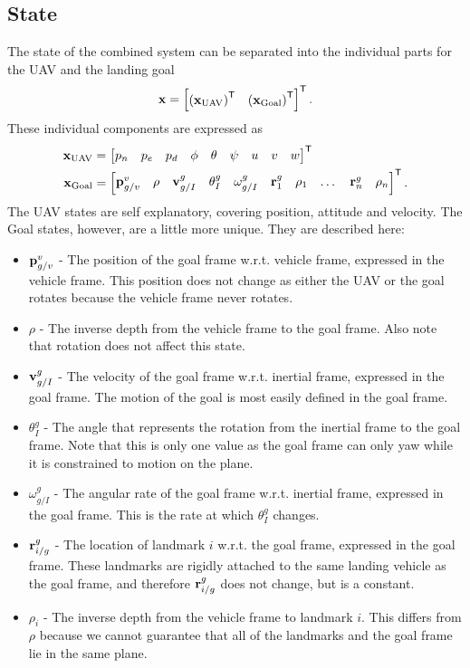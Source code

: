 \subsection{State}
The state of the combined system can be separated into the individual parts for
the UAV and the landing goal
\begin{equation}
  \boldsymbol{\mathrm{x}} =
  \begin{bmatrix}
    \left(\boldsymbol{\mathrm{x}}_{\text{UAV}}\right)^{\mathsf{T}} & \left(\boldsymbol{\mathrm{x}}_{\text{Goal}}\right)^{\mathsf{T}}
  \end{bmatrix}^{\mathsf{T}}.
\end{equation}
These individual components are expressed as
\begin{align}
  \boldsymbol{\mathrm{x}}_{\text{UAV}} &=
  \begin{bmatrix}
    p_n & p_e & p_d &
    \phi & \theta & \psi &
    u & v & w
  \end{bmatrix}^{\mathsf{T}} \\
  \boldsymbol{\mathrm{x}}_{\text{Goal}} & =
    \begin{bmatrix}
      \boldsymbol{\mathrm{p}}_{g/v}^{v} & \rho & \boldsymbol{\mathrm{v}}_{g/I}^{g} & \theta_{I}^{g} &
      \omega_{g/I}^{g} &
      \boldsymbol{\mathrm{r}}_{1}^{g} & \rho_{1} & \dots & \boldsymbol{\mathrm{r}}_{n}^{g} & \rho_{n}
    \end{bmatrix}^{\mathsf{T}}.
\end{align}
The UAV states are self explanatory, covering position, attitude and velocity.
The Goal states, however, are a little more unique. They are described here:
\begin{itemize}
  \item $\boldsymbol{\mathrm{p}}_{g/v}^{v}$ - The position of the goal frame w.r.t. vehicle
    frame, expressed in the vehicle frame. This position does not change as
    either the UAV or the goal rotates because the vehicle frame never rotates.
  \item $\rho$ - The inverse depth from the vehicle frame to the goal frame.
    Also note that rotation does not affect this state.
  \item $\boldsymbol{\mathrm{v}}_{g/I}^{g}$ - The velocity of the goal frame w.r.t. inertial
    frame, expressed in the goal frame. The motion of the goal is most easily
    defined in the goal frame.
  \item $\theta_I^g$ - The angle that represents the rotation from the inertial
    frame to the goal frame. Note that this is only one value as the goal frame
    can only yaw while it is constrained to motion on the plane.
  \item $\omega_{g/I}^g$ - The angular rate of the goal frame w.r.t. inertial
    frame, expressed in the goal frame. This is the rate at which $\theta_I^g$
    changes.
  \item $\boldsymbol{\mathrm{r}}_{i/g}^g$ - The location of landmark $i$ w.r.t. the goal frame,
    expressed in the goal frame. These landmarks are rigidly attached to the
    same landing vehicle as the goal frame, and therefore $\boldsymbol{\mathrm{r}}_{i/g}^g$
    does not change, but is a constant.
  \item $\rho_i$ - The inverse depth from the vehicle frame to landmark $i$.
    This differs from $\rho$ because we cannot guarantee that all of the
    landmarks and the goal frame lie in the same plane.
\end{itemize}

